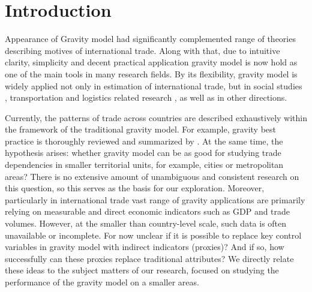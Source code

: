 \section{Introduction} 
\label{sec: intro}


Appearance of Gravity model had significantly complemented range of theories describing motives of international trade. Along with that, due to intuitive clarity, simplicity and decent practical application gravity model is now hold as one of the main tools in many research fields. By its flexibility, gravity model is widely applied not only in estimation of international trade, but in social studies \parencite{beine2016practitioners}, transportation and logistics related research \parencite{host2019trade, mendes2020impact}, as well as in other directions. 

Currently, the patterns of trade across countries are described exhaustively within the framework of the traditional gravity model. For example, gravity best practice is thoroughly reviewed and summarized by \textcite{yotov2016advanced}. At the same time, the hypothesis arises: whether gravity model can be as good for studying trade dependencies in smaller territorial units, for example, cities or metropolitan areas? There is no extensive amount of unambiguous and consistent research on this question, so this serves as the basis for our exploration. Moreover, particularly in international trade vast range of gravity applications are primarily relying on measurable and direct economic indicators such as GDP and trade volumes. However, at the smaller than country-level scale, such data is often unavailable or incomplete. For now unclear if it is possible to replace key control variables in gravity model with indirect indicators (proxies)? And if so, how successfully can these proxies replace traditional attributes?  We directly relate these ideas to the subject matters of our research, focused on studying the performance of the gravity model on a smaller areas.

